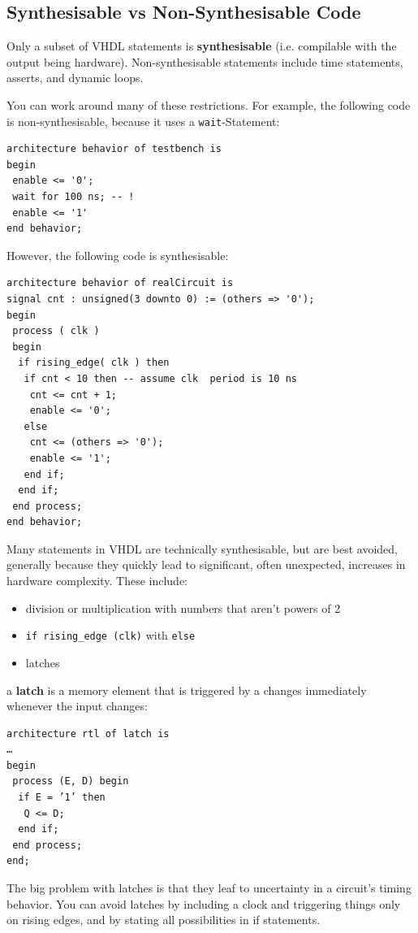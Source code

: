 \documentclass{report}
\newcommand{\tbf}{\textbf}
\newcommand*{\newpar}{\par\vspace{\baselineskip}\noindent} %
\begin{document}
\subsection{Synthesisable vs Non-Synthesisable Code}
Only a subset of VHDL statements is \tbf{synthesisable} (i.e. compilable with the output being hardware). Non-synthesisable statements include time statements, asserts, and dynamic loops.
\newpar
You can work around many of these restrictions. For example, the following code is non-synthesisable, because it uses a \texttt{wait}-Statement:
\begin{verbatim}
architecture behavior of testbench is
begin
 enable <= '0';
 wait for 100 ns; -- !
 enable <= '1'
end behavior;
\end{verbatim}
However, the following code is synthesisable:
\begin{verbatim}
architecture behavior of realCircuit is
signal cnt : unsigned(3 downto 0) := (others => '0');
begin
 process ( clk )
 begin
  if rising_edge( clk ) then
   if cnt < 10 then -- assume clk  period is 10 ns
    cnt <= cnt + 1;
    enable <= '0';
   else
    cnt <= (others => '0');
    enable <= '1';
   end if;
  end if;
 end process;
end behavior;
\end{verbatim}
\newpar
Many statements in VHDL are technically synthesisable, but are best avoided, generally because they quickly lead to significant, often unexpected, increases in hardware complexity. These include:
\begin{itemize}
 \item division or multiplication with numbers that aren't powers of 2
 \item \texttt{if rising\_edge (clk)} with \texttt{else}
 \item latches
\end{itemize}
\newpar
a \tbf{latch} is a memory element that is triggered by a changes immediately whenever the input changes:
\begin{verbatim}
architecture rtl of latch is
…
begin
 process (E, D) begin
  if E = ’1’ then
   Q <= D;
  end if;
 end process;
end;
\end{verbatim}
The big problem with latches is that they leaf to uncertainty in a circuit's timing behavior. You can avoid latches by including a clock and triggering things only on rising edges, and by stating all possibilities in if statements.
\end{document}
